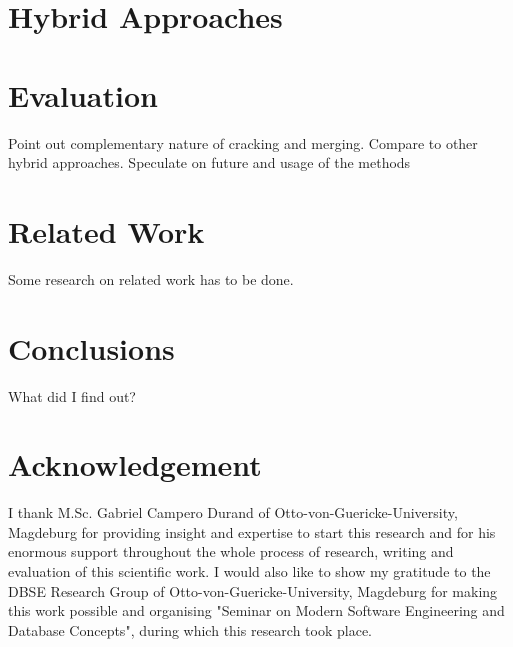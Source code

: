 \documentclass[10pt, conference, compsocconf]{IEEEtran}
\begin{document}
\section{Hybrid Approaches}

\section{Evaluation}
Point out complementary nature of cracking and merging. Compare to other hybrid approaches. Speculate on future and usage of the methods

\section{Related Work}
Some research on related work has to be done.

\section{Conclusions}
What did I find out?

\section*{Acknowledgement}
I thank M.Sc. Gabriel Campero Durand of Otto-von-Guericke-University, Magdeburg for providing insight and expertise to start this research and for his enormous support throughout the whole process of research, writing and evaluation of this scientific work. I would also like to show my gratitude to the DBSE Research Group of Otto-von-Guericke-University, Magdeburg for making this work possible and organising "Seminar on Modern Software Engineering and Database Concepts", during which this research took place.
\end{document}
